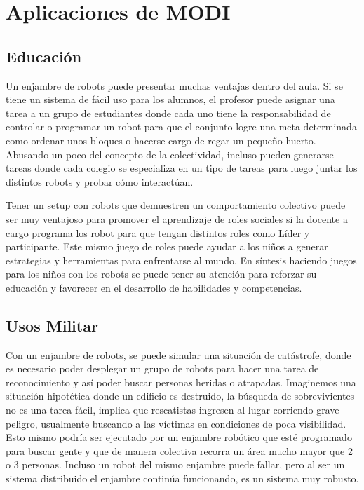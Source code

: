 
\chapter{Aplicaciones de MODI} %

\label{Chapter6} %



\section{Educación}

Un enjambre de robots puede presentar muchas ventajas dentro del aula. Si se tiene un sistema de fácil uso para los alumnos, el profesor puede asignar una tarea a un grupo de estudiantes donde cada uno tiene la responsabilidad de controlar o programar un robot para que el conjunto logre una meta determinada como ordenar unos bloques o hacerse cargo de regar un pequeño huerto. Abusando un poco del concepto de la colectividad, incluso pueden generarse tareas donde cada colegio se especializa en un tipo de tareas para luego juntar los distintos robots y probar cómo interactúan.

Tener un setup con robots que demuestren un comportamiento colectivo puede ser muy ventajoso para promover el aprendizaje de roles sociales si la docente a cargo programa los robot para que tengan distintos roles como Líder y participante. Este mismo juego de roles puede ayudar a los niños a generar estrategias y herramientas para enfrentarse al mundo. En síntesis haciendo juegos para los niños con los robots se puede tener su atención para reforzar su educación y favorecer en el desarrollo de habilidades y competencias. 

\section{Usos Militar}

Con un enjambre de robots, se puede simular una situación de catástrofe, donde es necesario poder desplegar un grupo de robots para hacer una tarea de reconocimiento y así poder buscar personas heridas o atrapadas.
Imaginemos una situación hipotética donde un edificio es destruido, la búsqueda de sobrevivientes no es una tarea fácil, implica que rescatistas ingresen al lugar corriendo grave peligro, usualmente buscando a las víctimas en condiciones de poca visibilidad. Esto mismo podría ser ejecutado por un enjambre robótico que esté programado para buscar gente y que de manera colectiva recorra un área mucho mayor que 2 o 3 personas. Incluso un robot del mismo enjambre puede fallar, pero al ser un sistema distribuido el enjambre continúa funcionando, es un sistema muy robusto.

